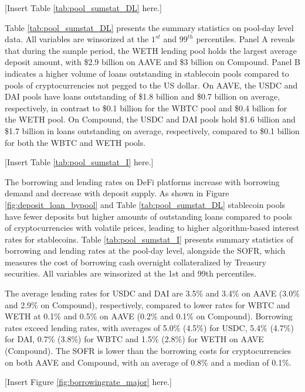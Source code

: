 \documentclass[12pt]{article}
\begin{document}
\centerline{[Insert Table \ref{tab:pool_sumstat_DL} here.]}

Table \ref{tab:pool_sumstat_DL} presents the summary statistics on pool-day level data. All variables are winsorized at the $1^{st}$ and $99^{th}$ percentiles. Panel A reveals that during the sample period, the WETH lending pool holds the largest average deposit amount, with \$2.9 billion on AAVE and \$3 billion on Compound. Panel B indicates a higher volume of loans outstanding in stablecoin pools compared to pools of cryptocurrencies not pegged to the US dollar. On AAVE, the USDC and DAI pools have loans outstanding of \$1.8 billion and \$0.7 billion on average, respectively, in contrast to \$0.1 billion for the WBTC pool and \$0.4 billion for the WETH pool. On Compound, the USDC and DAI pools hold \$1.6 billion and \$1.7 billion in loans outstanding on average, respectively, compared to \$0.1 billion for both the WBTC and WETH pools. 

\centerline{[Insert Table \ref{tab:pool_sumstat_I} here.]}

 The borrowing and lending rates on DeFi platforms increase with borrowing demand and decrease with deposit supply. As shown in Figure \ref{fig:deposit_loan_bypool} 
 and Table \ref{tab:pool_sumstat_DL} stablecoin pools have fewer deposits but higher amounts of outstanding loans compared to pools of cryptocurrencies with volatile prices, leading to higher algorithm-based interest rates for stablecoins. Table \ref{tab:pool_sumstat_I} presents summary statistics of borrowing and lending rates at the pool-day level, alongside the SOFR, which measures the cost of borrowing cash overnight collateralized by Treasury securities. All variables are winsorized at the 1st and 99th percentiles.

The average lending rates for USDC and DAI are 3.5\% and 3.4\% on AAVE (3.0\% and 2.9\% on Compound), respectively, compared to lower rates for WBTC and WETH at 0.1\% and 0.5\% on AAVE (0.2\% and 0.1\% on Compound). Borrowing rates exceed lending rates, with averages of 5.0\% (4.5\%) for USDC, 5.4\% (4.7\%) for DAI, 0.7\% (3.8\%) for WBTC and 1.5\% (2.8\%) for WETH on AAVE (Compound). The SOFR is lower than the borrowing costs for cryptocurrencies on both AAVE and Compound, with an average of 0.8\% and a median of 0.1\%.


\centerline{[Insert Figure \ref{fig:borrowingrate_major} here.]}
\end{document}
